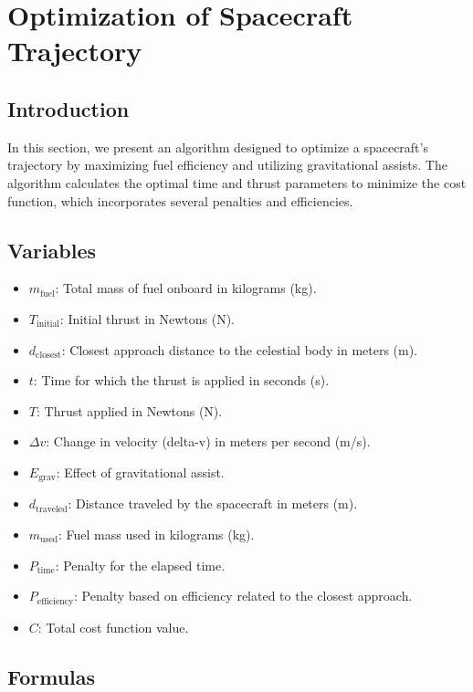 \section{Optimization of Spacecraft Trajectory}

\subsection{Introduction}

In this section, we present an algorithm designed to optimize a spacecraft's trajectory by maximizing fuel efficiency and utilizing gravitational assists. The algorithm calculates the optimal time and thrust parameters to minimize the cost function, which incorporates several penalties and efficiencies.

\subsection{Variables}

\begin{itemize}
    \item $m_{\text{fuel}}$: Total mass of fuel onboard in kilograms (kg).
    \item $T_{\text{initial}}$: Initial thrust in Newtons (N).
    \item $d_{\text{closest}}$: Closest approach distance to the celestial body in meters (m).
    \item $t$: Time for which the thrust is applied in seconds (s).
    \item $T$: Thrust applied in Newtons (N).
    \item $\Delta v$: Change in velocity (delta-v) in meters per second (m/s).
    \item $E_{\text{grav}}$: Effect of gravitational assist.
    \item $d_{\text{traveled}}$: Distance traveled by the spacecraft in meters (m).
    \item $m_{\text{used}}$: Fuel mass used in kilograms (kg).
    \item $P_{\text{time}}$: Penalty for the elapsed time.
    \item $P_{\text{efficiency}}$: Penalty based on efficiency related to the closest approach.
    \item $C$: Total cost function value.
\end{itemize}

\subsection{Formulas}

